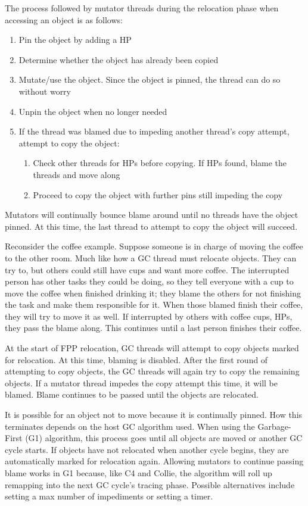 \documentclass{sig-alternate}
\begin{document}
The process followed by mutator threads during the relocation phase when 
accessing an object is as follows:
\begin{enumerate}
\item Pin the object by adding a HP
\item Determine whether the object has already been copied
\item Mutate/use the object. Since the object is pinned, the thread can 
do so without worry
\item Unpin the object when no longer needed
\item If the thread was blamed due to impeding another thread's copy attempt, 
attempt to copy the object:
\begin{enumerate}
\item Check other threads for HPs before copying. If HPs found,
blame the threads and move along
\item Proceed to copy the object with further pins still impeding the copy
\end{enumerate}
\end{enumerate}
Mutators will continually bounce blame around until
no threads have the object pinned. At this time, the last thread
to attempt to copy the object will succeed.

Reconsider the coffee example. Suppose
someone is in charge of moving the coffee to the other room.
Much like how a GC thread must relocate objects. They
can try to, but others could still have cups and want more coffee.
The interrupted person has other tasks they could be doing, so they tell
everyone with a cup to move the coffee when finished drinking it;
they blame the others for not finishing the task and make them responsible
for it. When those blamed finish their coffee, they will try to
move it as well. If interrupted by others with coffee cups, HPs, they
pass the blame along. This continues until a last person finishes 
their coffee.

At the start of FPP relocation, GC threads will attempt to copy
objects marked for relocation. At this time, blaming is 
disabled. 
After the first round of attempting to copy objects, the GC threads
will again try to copy the remaining objects. If a mutator 
thread impedes the copy attempt this time, it will be blamed.
Blame continues to be passed until the objects are relocated. 

It is possible for an
object not to move because it is continually pinned. How this terminates 
depends on the host GC algorithm used. When using the Garbage-First (G1) algorithm,
this process goes until all objects are moved or another GC cycle starts.
If objects have not relocated when another cycle begins, they are automatically
marked for relocation again. Allowing mutators to continue passing blame works
in G1 because, like C4 and Collie, the algorithm will roll up remapping into the next
GC cycle's tracing phase. Possible alternatives include setting a max number of impediments
or setting a timer.
\end{document}
